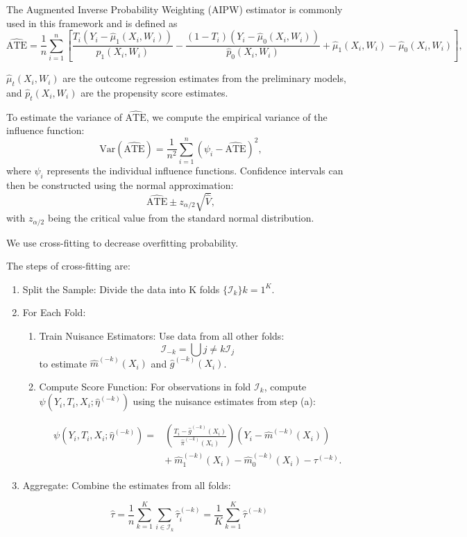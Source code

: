 \documentclass{article}
\begin{document}
The Augmented Inverse Probability Weighting (AIPW) estimator is commonly used in this framework and is defined as
\[
\hat{\text{ATE}} = \frac{1}{n} \sum_{i=1}^n \left[ \frac{T_i (Y_i - \hat{\mu}_1(X_i, W_i))}{\hat{p}_1(X_i, W_i)} - \frac{(1 - T_i) (Y_i - \hat{\mu}_0(X_i, W_i))}{\hat{p}_0(X_i, W_i)} + \hat{\mu}_1(X_i, W_i) - \hat{\mu}_0(X_i, W_i) \right],
\]

\( \hat{\mu}_t(X_i, W_i) \) are the outcome regression estimates from the preliminary models, and \( \hat{p}_t(X_i, W_i) \) are the propensity score estimates.

To estimate the variance of \( \hat{\text{ATE}} \), we compute the empirical variance of the influence function:
\[
\text{Var}(\hat{\text{ATE}}) = \frac{1}{n^2} \sum_{i=1}^n \left( \psi_i - \hat{\text{ATE}} \right)^2,
\]
where \( \psi_i \) represents the individual influence functions. Confidence intervals can then be constructed using the normal approximation:
\[
\hat{\text{ATE}} \pm z_{\alpha/2} \sqrt{\hat{V}},
\]
with \( z_{\alpha/2} \) being the critical value from the standard normal distribution.

We use cross-fitting to decrease overfitting probability.

The steps of cross-fitting are:

\begin{enumerate}
\item Split the Sample: Divide the data into K folds $\{\mathcal{I}_k\}{k=1}^K$.
\item For Each Fold:
\begin{enumerate}
\item Train Nuisance Estimators: Use data from all other folds:
$$
\mathcal{I}_{-k} = \bigcup{j \neq k} \mathcal{I}_j
$$
to estimate $\hat{m}^{(-k)}(X_i)$ and $\hat{g}^{(-k)}(X_i)$.

\item Compute Score Function: For observations in fold $\mathcal{I}_k$, compute $\psi(Y_i, T_i, X_i; \hat{\eta}^{(-k)})$ using the nuisance estimates from step (a):

\begin{equation}
    \begin{split}
        \psi(Y_i, T_i, X_i; \hat{\eta}^{(-k)}) = & \left( \frac{T_i - \hat{g}^{(-k)}(X_i)}{\hat{\pi}^{(-k)}(X_i)} \right) (Y_i - \hat{m}^{(-k)}(X_i)) \\
        & + \ \hat{m}_1^{(-k)}(X_i) - \hat{m}_0^{(-k)}(X_i) - \tau^{(-k)}.
    \end{split}
    \label{eq:orthogonal_score_fold_k}
\end{equation}

\end{enumerate}
\item Aggregate: Combine the estimates from all folds:

\begin{equation}
\hat{\tau} = \frac{1}{n} \sum_{k=1}^K \sum_{i \in \mathcal{I}_k} \hat{\tau}_i^{(-k)} =  \frac{1}{K} \sum_{k=1}^K \hat{\tau}^{(-k)}
\label{eq:avg_tau_hat}
\end{equation}

\end{enumerate}
\end{document}
